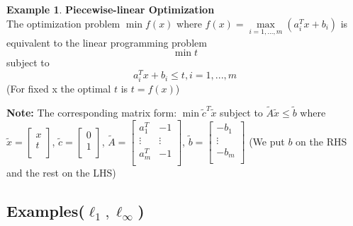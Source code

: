 \documentclass[10pt]{article}
\theoremstyle{definition}
\newtheorem{example}{Example}[section]
\newcommand{\Note}[0]{\noindent\textbf{Note: }}
\begin{document}
\begin{example}\textbf{Piecewise-linear Optimization}\\
	The optimization problem $\min f(x)$ where $f(x) = \max\limits_{i=1,...,m}(a_{i}^Tx+b_i)$ is equivalent to the linear programming problem
	$$\min t$$ subject to $$a_{i}^Tx + b_i \le t, i = 1, ..., m$$
	(For fixed x the optimal $t$ is $t = f(x)$)
\end{example}
\Note The corresponding matrix form:
$\min \tilde{c}^T\tilde{x}$
subject to
$\tilde{A}\tilde{x} \le \tilde{b}$ where\\
$\tilde{x} = \begin{bmatrix} x\\ t\\ \end{bmatrix}$, $\tilde{c} = \begin{bmatrix} 0\\ 1\\ \end{bmatrix}$, $\tilde{A} = \begin{bmatrix} a_{1}^T & -1 \\ \vdots & \vdots \\ a_{m}^T & -1\\ \end{bmatrix}$, $\tilde{b} = \begin{bmatrix} -b_1\\ \vdots \\ -b_m \\ \end{bmatrix}$
(We put $b$ on the RHS and the rest on the LHS)\\

\subsection{Examples($\ell_{1}, \ell_{\infty}$)}
\end{document}
